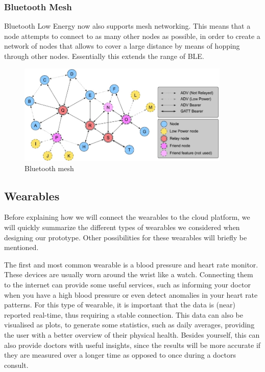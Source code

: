 \documentclass[12pt, a4paper]{article}
\newcommand{\bluetooth}{Bluetooth}
\newcommand{\ble}{\bluetooth{} Low Energy}
\newcommand{\bles}{BLE}
\begin{document}
\subsubsection{Bluetooth Mesh}
\ble{} now also supports mesh networking. This means that a node attempts to connect to as many other nodes as possible, in order to create a network of nodes that allows to cover a large distance by means of hopping through other nodes. Essentially this extends the range of \bles{}.

\begin{figure}[htbp]
\includegraphics[width=0.9\textwidth]{images/bt_mesh_topology.jpg}
\centering
\caption{\bluetooth{} mesh}
\end{figure}

\newpage

\subsection{Wearables}
\label{wearables}
Before explaining how we will connect the wearables to the cloud platform, we will quickly summarize the different types of wearables we considered when designing our prototype. Other possibilities for these wearables will briefly be mentioned.

The first and most common wearable is a blood pressure and heart rate monitor. These devices are usually worn around the wrist like a watch. Connecting them to the internet can provide some useful services, such as informing your doctor when you have a high blood pressure or even detect anomalies in your heart rate patterns. For this type of wearable, it is important that the data is (near) reported real-time, thus requiring a stable connection. This data can also be visualised as plots, to generate some statistics, such as daily averages, providing the user with a better overview of their physical health. Besides yourself, this can also provide doctors with useful insights, since the results will be more accurate if they are measured over a longer time as opposed to once during a doctors consult.
\end{document}
